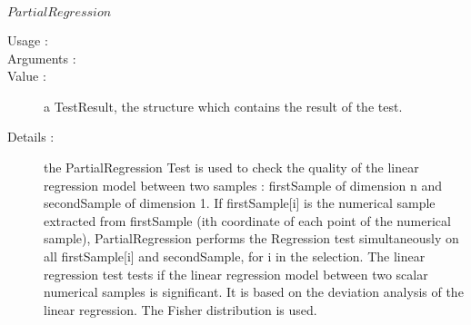 \begin{description}
\begin{description}
  \item $PartialRegression$
    \begin{description}
    \item[Usage :] \rule{0pt}{1em}
    \item[Arguments :] \rule{0pt}{1em}
    \item[Value :]  a TestResult, the structure which contains the result of the test.
    \item[Details :] the PartialRegression Test is used to check the quality of the linear regression model between two samples : firstSample of dimension n and secondSample of dimension 1. If firstSample[i] is the numerical sample extracted from firstSample (ith coordinate of each point of the numerical sample), PartialRegression performs the Regression test simultaneously on all firstSample[i] and secondSample, for i in the selection. The linear regression test tests if the linear regression model between two scalar numerical samples is significant. It is based on the deviation analysis of the linear regression. The Fisher distribution is used.
    \end{description}
    \bigskip


\end{description}
\end{description}
